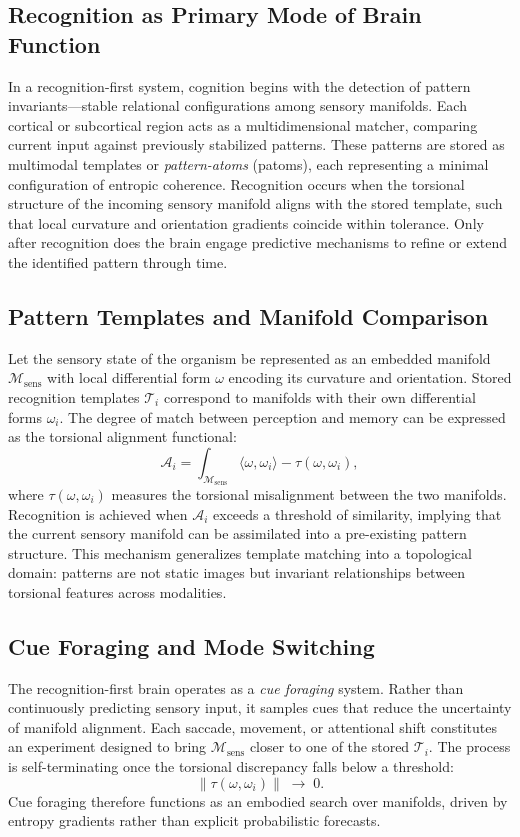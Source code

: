 \documentclass[11pt]{article}
\begin{document}
\subsection{Recognition as Primary Mode of Brain Function}
In a recognition-first system, cognition begins with the detection of pattern invariants---stable relational configurations among sensory manifolds. Each cortical or subcortical region acts as a multidimensional matcher, comparing current input against previously stabilized patterns. These patterns are stored as multimodal templates or \textit{pattern-atoms} (patoms), each representing a minimal configuration of entropic coherence. Recognition occurs when the torsional structure of the incoming sensory manifold aligns with the stored template, such that local curvature and orientation gradients coincide within tolerance. Only after recognition does the brain engage predictive mechanisms to refine or extend the identified pattern through time.

\subsection{Pattern Templates and Manifold Comparison}
Let the sensory state of the organism be represented as an embedded manifold $\mathcal{M}_{\mathrm{sens}}$ with local differential form $\omega$ encoding its curvature and orientation. Stored recognition templates $\mathcal{T}_i$ correspond to manifolds with their own differential forms $\omega_i$. The degree of match between perception and memory can be expressed as the torsional alignment functional:
\[
\mathcal{A}_i =
\int_{\mathcal{M}_{\mathrm{sens}}}
\big\langle \omega, \omega_i \big\rangle
- \tau(\omega, \omega_i),
\]
where $\tau(\omega,\omega_i)$ measures the torsional misalignment between the two manifolds. Recognition is achieved when $\mathcal{A}_i$ exceeds a threshold of similarity, implying that the current sensory manifold can be assimilated into a pre-existing pattern structure. This mechanism generalizes template matching into a topological domain: patterns are not static images but invariant relationships between torsional features across modalities.

\subsection{Cue Foraging and Mode Switching}
The recognition-first brain operates as a \emph{cue foraging} system. Rather than continuously predicting sensory input, it samples cues that reduce the uncertainty of manifold alignment. Each saccade, movement, or attentional shift constitutes an experiment designed to bring $\mathcal{M}_{\mathrm{sens}}$ closer to one of the stored $\mathcal{T}_i$. The process is self-terminating once the torsional discrepancy falls below a threshold:
\[
\|\tau(\omega, \omega_i)\| \;\to\; 0.
\]
Cue foraging therefore functions as an embodied search over manifolds, driven by entropy gradients rather than explicit probabilistic forecasts.
\end{document}
